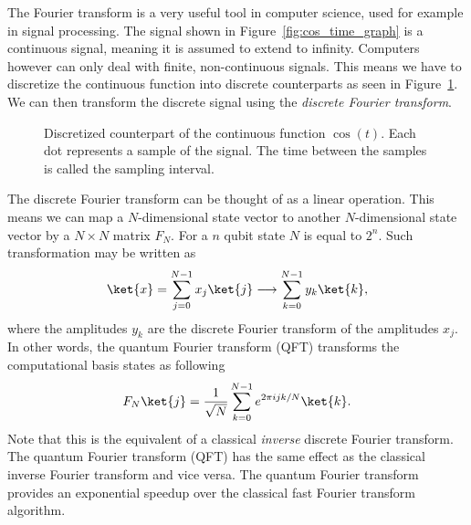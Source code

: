 The Fourier transform is a very useful tool in computer science, used for example in signal processing. The signal shown in Figure~\ref{fig:cos_time_graph} is a continuous signal, meaning it is assumed to extend to infinity. Computers however can only deal with finite, non-continuous signals. This means we have to discretize the continuous function into discrete counterparts as seen in Figure~\ref{fig:cos_discrete_time_graph}. We can then transform the discrete signal using the \emph{discrete Fourier transform}.
\begin{figure}[ht]
  \centering
  \caption{Discretized counterpart of the continuous function $\cos(t)$. Each dot represents a sample of the signal. The time between the samples is called the sampling interval.}
  \label{fig:cos_discrete_time_graph}
\end{figure}

The discrete Fourier transform can be thought of as a linear operation. This means we can map a $N$-dimensional state vector to another $N$-dimensional state vector by a $N \times N$ matrix $F_N$. For a $n$ qubit state $N$ is equal to $2^n$. Such transformation may be written as
\begin{equation}
  \ket{x} = \sum_{j=0}^{N-1}x_j\ket{j} \longrightarrow \sum_{k=0}^{N-1}y_k\ket{k},
\end{equation}
where the amplitudes $y_k$ are the discrete Fourier transform of the amplitudes $x_j$. In other words, the quantum Fourier transform (QFT) transforms the computational basis states as following
\begin{equation} \label{eq:qft}
  F_N\ket{j} = \dfrac{1}{\sqrt N}\sum_{k=0}^{N-1}e^{2\pi i jk/N}\ket{k}.
\end{equation}
Note that this is the equivalent of a classical \emph{inverse} discrete Fourier transform. The quantum Fourier transform (QFT) has the same effect as the classical inverse Fourier transform and vice versa. The quantum Fourier transform provides an exponential speedup over the classical fast Fourier transform algorithm.

